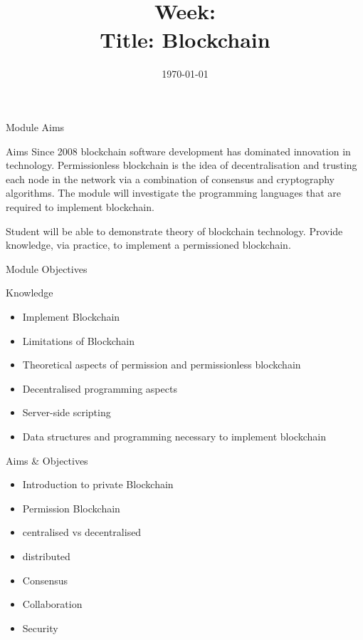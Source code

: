 \documentclass[pdf,table]{beamer}
\title[\moduleCode:L\theweek]{\moduleTitle \\ Week: \theweek \\ Title: Blockchain}
\institute[]{\texttt{[image: ../../../logo/mdxSmall]} \\ Middlesex University, \\Dept. of Computer Science, \\London}
\author[\email]{\moduleLeader}
\date{\today}
\begin{document}
	\begin{frame}
		\titlepage
	\end{frame}



	\begin{frame}{Module Aims}
		\begin{block}{Aims}
			Since 2008 blockchain software development has dominated innovation in technology. 
			Permissionless blockchain is the idea of decentralisation and trusting each node in the network via a combination of consensus
			and cryptography algorithms. The module will investigate the programming languages that are required to implement blockchain.

			Student will be able to demonstrate theory of blockchain technology.
			Provide knowledge, via practice, to implement a permissioned blockchain. 
		\end{block}
	\end{frame}

	\begin{frame}{Module Objectives}
		\begin{block}{Knowledge}
			\begin{itemize}
				\item Implement Blockchain
				\item Limitations of Blockchain
				\item Theoretical aspects of permission and permissionless blockchain
				\item Decentralised programming aspects
				\item Server-side scripting
				\item Data structures and programming necessary to implement blockchain
			\end{itemize}	
		\end{block}
	\end{frame}

	\begin{frame}{Aims \& Objectives}
		\begin{itemize}
			\item Introduction to private Blockchain
			\item Permission Blockchain
			\item centralised vs decentralised
			\item distributed
			\item Consensus
			\item Collaboration
			\item Security
		\end{itemize}
	\end{frame}	
\end{document}

